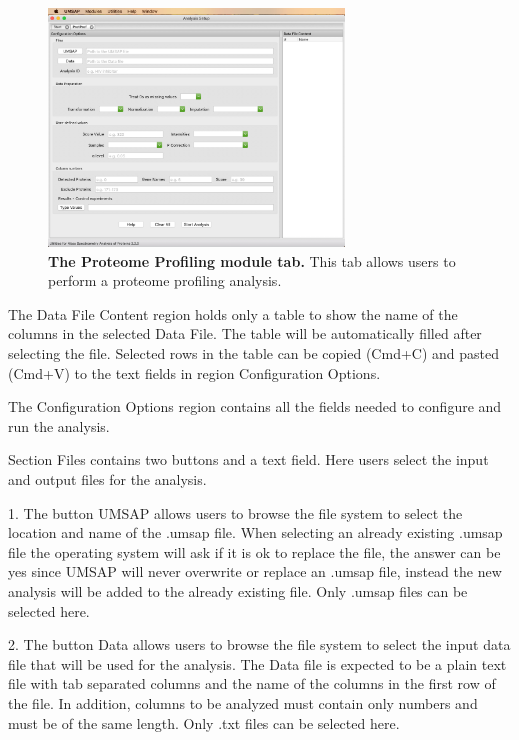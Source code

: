 \begin{figure}[h]
	\centering
	\includegraphics[width=0.7\textwidth]{./IMAGES/MOD-PROTPROF/protprof-mod.jpg}
	\caption[The Proteome Profiling module tab]{\textbf{The Proteome Profiling module
    tab.} This tab allows users to perform a proteome profiling analysis.}
	\label{fig:protprofTab}
	\vspace{-5pt}
\end{figure}

The Data File Content region holds only a table to show the name of the columns in
the selected Data File. The table will be automatically filled after selecting the
file. Selected rows in the table can be copied (Cmd+C) and pasted (Cmd+V) to the
text fields in region Configuration Options.

The Configuration Options region contains all the fields needed to configure and
run the analysis.

Section Files contains two buttons and a text field. Here users select the input
and output files for the analysis.

\num{1}. The button UMSAP allows users to browse the file system to select the location
and name of the .umsap file. When selecting an already existing .umsap file the operating
system will ask if it is ok to replace the file, the answer can be yes since UMSAP
will never overwrite or replace an .umsap file, instead the new analysis will be
added to the already existing file. Only .umsap files can be selected here.

\num{2}. The button Data allows users to browse the file system to select the input
data file that will be used for the analysis. The Data file is expected to be a
plain text file with tab separated columns and the name of the columns in the first
row of the file. In addition, columns to be analyzed must contain only numbers and
must be of the same length. Only .txt files can be selected here.

